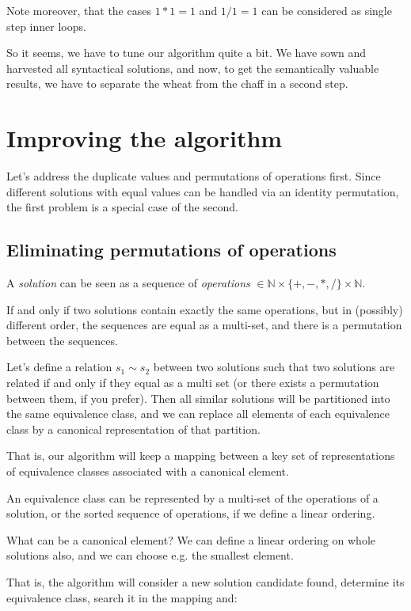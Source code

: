 \documentclass[english]{article}
\begin{document}
Note moreover, that the cases $1*1=1$ and $1/1=1$ can be considered as single step inner loops.

\medskip

So it seems, we have to tune our algorithm quite a bit. We have sown and harvested all syntactical solutions, and now, to get the semantically valuable results, we have to separate the wheat from the chaff in a second step.

\section{Improving the algorithm}

Let's address the duplicate values and permutations of operations first. Since different solutions with equal values can be handled via an identity permutation, the first problem is a special case of the second.

\subsection{Eliminating permutations of operations}

A \emph{solution} can be seen as a sequence of \emph{operations} $\in \mathbb{N}\times\lbrace+,-,*,/\rbrace\times\mathbb{N}$.

If and only if two solutions contain exactly the same operations, but in (possibly) different order, the sequences are equal as a multi-set, and there is a permutation between the sequences.

Let's define a relation $s_1 \sim s_2$ between two solutions such that two solutions are related if and only if they equal as a multi set (or there exists a permutation between them, if you prefer). Then all similar solutions will be partitioned into the same equivalence class, and we can replace all elements of each equivalence class by a canonical representation of that partition.

That is, our algorithm will keep a mapping between a key set of representations of equivalence classes associated with a canonical element.

An equivalence class can be represented by a multi-set of the operations of a solution, or the sorted sequence of operations, if we define a linear ordering.

What can be a canonical element? We can define a linear ordering on whole solutions also, and we can choose e.g. the smallest element.

That is, the algorithm will consider a new solution candidate found, determine its equivalence class, search it in the mapping and:
\end{document}
